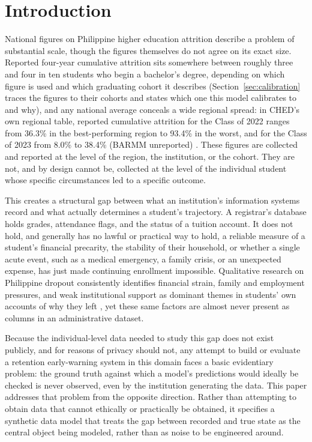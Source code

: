 \documentclass[11pt]{article}
\begin{document}
\vspace{10pt}

\FloatBarrier
\section{Introduction}
\label{sec:intro}

National figures on Philippine higher education attrition describe a problem of substantial scale, though the figures themselves do not agree on its exact size. Reported four-year cumulative attrition sits somewhere between roughly three and four in ten students who begin a bachelor's degree, depending on which figure is used and which graduating cohort it describes (Section~\ref{sec:calibration} traces the figures to their cohorts and states which one this model calibrates to and why), and any national average conceals a wide regional spread: in CHED's own regional table, reported cumulative attrition for the Class of 2022 ranges from 36.3\% in the best-performing region to 93.4\% in the worst, and for the Class of 2023 from 8.0\% to 38.4\% (BARMM unreported) \citep{cpbrd2026}. These figures are collected and reported at the level of the region, the institution, or the cohort. They are not, and by design cannot be, collected at the level of the individual student whose specific circumstances led to a specific outcome.

This creates a structural gap between what an institution's information systems record and what actually determines a student's trajectory. A registrar's database holds grades, attendance flags, and the status of a tuition account. It does not hold, and generally has no lawful or practical way to hold, a reliable measure of a student's financial precarity, the stability of their household, or whether a single acute event, such as a medical emergency, a family crisis, or an unexpected expense, has just made continuing enrollment impossible. Qualitative research on Philippine dropout consistently identifies financial strain, family and employment pressures, and weak institutional support as dominant themes in students' own accounts of why they left \citep{cahilog2025,socioeconomic2024}, yet these same factors are almost never present as columns in an administrative dataset.

Because the individual-level data needed to study this gap does not exist publicly, and for reasons of privacy should not, any attempt to build or evaluate a retention early-warning system in this domain faces a basic evidentiary problem: the ground truth against which a model's predictions would ideally be checked is never observed, even by the institution generating the data. This paper addresses that problem from the opposite direction. Rather than attempting to obtain data that cannot ethically or practically be obtained, it specifies a synthetic data model that treats the gap between recorded and true state as the central object being modeled, rather than as noise to be engineered around.
\end{document}
